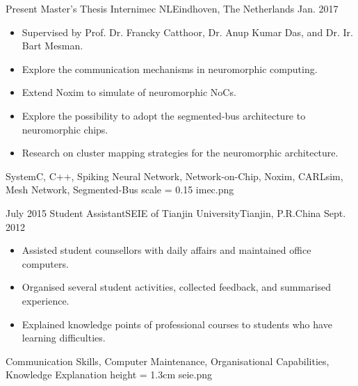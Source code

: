 %
%
%
%
%

\begin{experiences}
	\experience
    {Present}	{Master's Thesis Intern}{imec NL}{Eindhoven, The Netherlands}
    {Jan. 2017}	{
    				\begin{itemize}
                    	\item Supervised by Prof. Dr. Francky Catthoor, Dr. Anup Kumar Das, and Dr. Ir. Bart Mesman.
    					\item Explore the communication mechanisms in neuromorphic computing.
                        \item Extend Noxim to simulate of neuromorphic NoCs.
                        \item Explore the possibility to adopt the segmented-bus architecture to neuromorphic chips. 
                        \item Research on cluster mapping strategies for the neuromorphic architecture.
    				\end{itemize}
    			}
                {SystemC, C++, Spiking Neural Network, Network-on-Chip, Noxim, CARLsim, Mesh Network, Segmented-Bus}
     {scale = 0.15}		{imec.png} 
	\emptySeparator
    
    
    \experience
    {July 2015}	{Student Assistant}{SEIE of Tianjin University}{Tianjin, P.R.China}
    {Sept. 2012}	{
    				\begin{itemize}
                    	\item Assisted student counsellors with daily affairs and maintained office computers. 
    					\item Organised several student activities, collected feedback, and summarised experience.
                        \item Explained knowledge points of professional courses to students who have learning difficulties.
    				\end{itemize}
    			}
                {Communication Skills, Computer Maintenance, Organisational Capabilities, Knowledge Explanation}
     {height = 1.3cm}		{seie.png} 
    
\end{experiences}